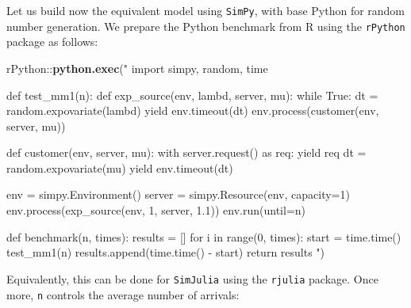 \documentclass[twoside,nohyper]{tufte-book}
\newenvironment{Shaded}{}{}
\newcommand{\KeywordTok}[1]{\textcolor[rgb]{0.00,0.44,0.13}{\textbf{#1}}}
\newcommand{\NormalTok}[1]{#1}
\newcommand{\OperatorTok}[1]{\textcolor[rgb]{0.40,0.40,0.40}{#1}}
\newcommand{\StringTok}[1]{\textcolor[rgb]{0.25,0.44,0.63}{#1}}
\begin{document}
Let us build now the equivalent model using \texttt{SimPy}, with base Python for random number generation. We prepare the Python benchmark from R using the \texttt{rPython} package\cite[0pt]{CRAN:rPython} as follows:

\begin{Shaded}
\begin{Highlighting}[]
\NormalTok{rPython}\OperatorTok{::}\KeywordTok{python.exec}\NormalTok{(}\StringTok{"}
\StringTok{import simpy, random, time}

\StringTok{def test_mm1(n):}
\StringTok{  def exp_source(env, lambd, server, mu):}
\StringTok{      while True:}
\StringTok{          dt = random.expovariate(lambd)}
\StringTok{          yield env.timeout(dt)}
\StringTok{          env.process(customer(env, server, mu))}

\StringTok{  def customer(env, server, mu):}
\StringTok{      with server.request() as req:}
\StringTok{          yield req}
\StringTok{          dt = random.expovariate(mu)}
\StringTok{          yield env.timeout(dt)}

\StringTok{  env = simpy.Environment()}
\StringTok{  server = simpy.Resource(env, capacity=1)}
\StringTok{  env.process(exp_source(env, 1, server, 1.1))}
\StringTok{  env.run(until=n)}

\StringTok{def benchmark(n, times):}
\StringTok{  results = []}
\StringTok{  for i in range(0, times):}
\StringTok{    start = time.time()}
\StringTok{    test_mm1(n)}
\StringTok{    results.append(time.time() - start)}
\StringTok{  return results}
\StringTok{"}\NormalTok{)}
\end{Highlighting}
\end{Shaded}

Equivalently, this can be done for \texttt{SimJulia} using the \texttt{rjulia} package\cite[0pt]{GitHub:rJulia}. Once more, \texttt{n} controls the average number of arrivals:
\end{document}
